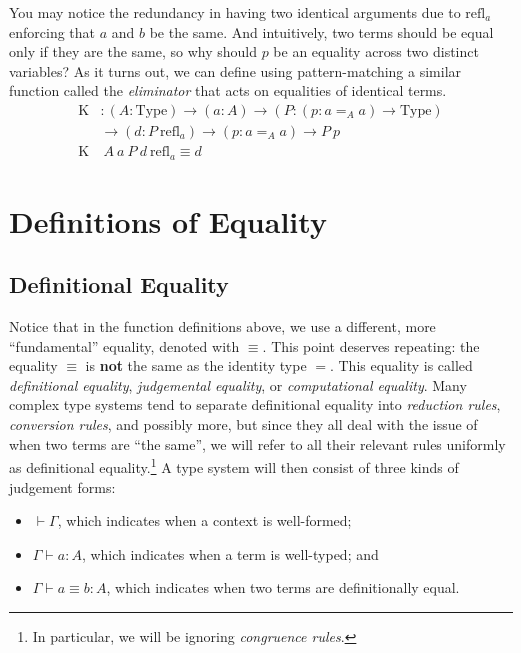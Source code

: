 \documentclass{report}
\newcommand{\const}[1]{\text{#1}}
\newcommand{\Type}{\const{Type}}
\newcommand{\refl}{\const{refl}}
\newcommand{\kelim}{\const{K}\xspace}
\begin{document}
You may notice the redundancy in having two identical arguments due to $\refl_a$ enforcing that $a$ and $b$ be the same. And intuitively, two terms should be equal only if they are the same, so why should $p$ be an equality across two distinct variables? As it turns out, we can define using pattern-matching a similar function called the \emph{\kelim eliminator} that acts on equalities of identical terms.
%
\begin{align*}
    \kelim & : (A : \Type) \to (a : A) \to (P : (p : a =_A a) \to \Type) \\
    &\to (d : P ~ \refl_a) \to (p : a =_A a) \to P ~ p \\
    \kelim &~ A ~ a ~ P ~ d ~ \refl_a \equiv d
\end{align*}

\section{Definitions of Equality}

\subsection{Definitional Equality}

Notice that in the function definitions above, we use a different, more ``fundamental'' equality, denoted with $\equiv$. This point deserves repeating: the equality $\equiv$ is \textbf{not} the same as the identity type $=$. This equality is called \emph{definitional equality}, \emph{judgemental equality}, or  \emph{computational equality}. Many complex type systems tend to separate definitional equality into \emph{reduction rules}, \emph{conversion rules}, and possibly more, but since they all deal with the issue of when two terms are ``the same'', we will refer to all their relevant rules uniformly as definitional equality.\footnote{In particular, we will be ignoring \emph{congruence rules}.} A type system will then consist of three kinds of judgement forms:

\begin{itemize}
    \item $\vdash \Gamma$, which indicates when a context is well-formed;
    \item $\Gamma \vdash a : A$, which indicates when a term is well-typed; and
    \item $\Gamma \vdash a \equiv b : A$, which indicates when two terms are definitionally equal.
\end{itemize}
\end{document}
